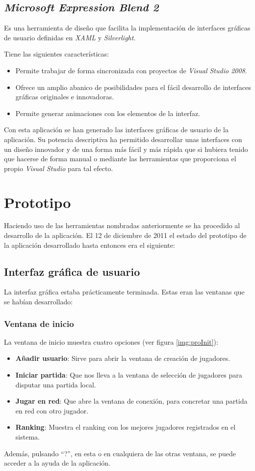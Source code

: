 \subsection{\emph{Microsoft Expression Blend 2}}
Es una herramienta de diseño que facilita la implementación de interfaces
gráficas de usuario definidas en \emph{XAML} y \emph{Silverlight}.

Tiene las siguientes características:
\begin{itemize}
\item Permite trabajar de forma sincronizada con proyectos de \emph{Visual
Studio 2008}.
\item Ofrece un amplio abanico de posibilidades para el fácil desarrollo de 
interfaces gráficas originales e innovadoras.
\item Permite generar animaciones con los elementos de la interfaz.
\end{itemize}

Con esta aplicación se han generado las interfaces gráficas de usuario de la 
aplicación. Su potencia descriptiva ha permitido desarrollar unas interfaces
con un diseño innovador y de una forma más fácil y más rápida que si hubiera
tenido que hacerse de forma manual o mediante las herramientas que proporciona
el propio \emph{Visual Studio} para tal efecto.

\section{Prototipo}
Haciendo uso de las herramientas nombradas anteriormente se ha procedido al
desarrollo de la aplicación. El 12 de diciembre de 2011 el estado del prototipo
de la aplicación desarrollado hasta entonces era el siguiente:

\subsection{Interfaz gráfica de usuario}
La interfaz gráfica estaba prácticamente terminada. Estas eran las ventanas
que se habían desarrollado:

\subsubsection{Ventana de inicio}
La ventana de inicio muestra cuatro opciones (ver figura \ref{img:proInit}):
\begin{itemize}
\item \textbf{Añadir usuario}: Sirve para abrir la ventana de creación de
jugadores.
\item \textbf{Iniciar partida}: Que nos lleva a la ventana de selección de
jugadores para disputar una partida local.
\item \textbf{Jugar en red}: Que abre la ventana de conexión, para concretar
una partida en red con otro jugador.
\item \textbf{Ranking}: Muestra el ranking con los mejores jugadores
registrados en el sistema.
\end{itemize}
Además, pulsando ``?'', en esta o en cualquiera de las otras ventana, se puede 
acceder a la ayuda de la aplicación.

